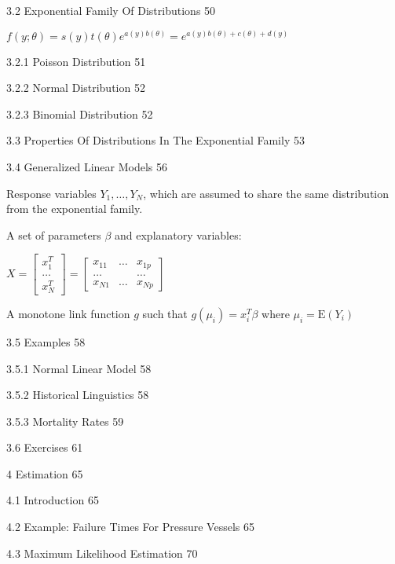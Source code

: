 3.2 Exponential Family Of Distributions 50

$f(y;\theta)=s(y)t(\theta)e^{a(y)b(\theta)}=e^{a(y)b(\theta)+c(\theta)+d(y)}$

3.2.1 Poisson Distribution 51



3.2.2 Normal Distribution 52



3.2.3 Binomial Distribution 52



3.3 Properties Of Distributions In The Exponential Family 53



3.4 Generalized Linear Models 56

Response variables $Y_1,\dots,Y_N$, which are assumed to share the same distribution from the exponential family.

A set of parameters $\beta$ and explanatory variables:

$X = \begin{bmatrix} x_1^T \\ \dots \\ x_N^T \end{bmatrix} = \begin{bmatrix} x_{11} & \dots & x_{1p} \\ \dots & \text{ } & \dots \\ x_{N1} & \dots & x_{Np} \end{bmatrix}$

A monotone link function $g$ such that $g(\mu_i)=x_i^T \beta$ where $\mu_i = \text{E}(Y_i)$

3.5 Examples 58



3.5.1 Normal Linear Model 58



3.5.2 Historical Linguistics 58



3.5.3 Mortality Rates 59



3.6 Exercises 61



4 Estimation 65



4.1 Introduction 65



4.2 Example: Failure Times For Pressure Vessels 65



4.3 Maximum Likelihood Estimation 70



